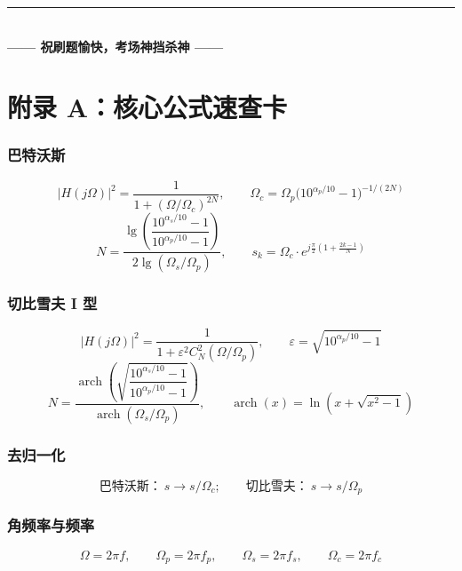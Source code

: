 \documentclass[12pt,a4paper]{ctexart}
\newcommand{\Omegac}{\Omega_c}
\newcommand{\Omegap}{\Omega_p}
\newcommand{\Omegas}{\Omega_s}
\newcommand{\arch}{\operatorname{arch}}
\begin{document}
\vspace{20pt}

\begin{center}
\rule{0.6\textwidth}{0.5pt}\\[8pt]
{\large\kaishu\bfseries —— 祝刷题愉快，考场神挡杀神 ——}
\end{center}

\newpage
\section*{附录 A：核心公式速查卡}

\begin{tcolorbox}[enhanced, colback=white, colframe=black!60,
    title={\textbf{公式速查：一张 A4 纸搞定滤波器设计}}, fonttitle=\bfseries\large,
    sharp corners, breakable]

\subsubsection*{巴特沃斯}
\[
|H(j\Omega)|^2 = \frac{1}{1+(\Omega/\Omegac)^{2N}},\qquad
\Omegac = \Omega_p\bigl(10^{\alpha_p/10}-1\bigr)^{-1/(2N)}
\]
\[
N = \frac{\lg\!\left(\dfrac{10^{\alpha_s/10}-1}{10^{\alpha_p/10}-1}\right)}{2\lg(\Omegas/\Omegap)},\qquad
s_k = \Omegac\cdot e^{j\frac{\pi}{2}\left(1+\frac{2k-1}{N}\right)}
\]

\subsubsection*{切比雪夫 I 型}
\[
|H(j\Omega)|^2 = \frac{1}{1+\varepsilon^2 C_N^2(\Omega/\Omegap)},\qquad
\varepsilon = \sqrt{10^{\alpha_p/10}-1}
\]
\[
N = \frac{\arch\!\left(\sqrt{\dfrac{10^{\alpha_s/10}-1}{10^{\alpha_p/10}-1}}\right)}{\arch(\Omegas/\Omegap)},\qquad
\arch(x) = \ln(x+\sqrt{x^2-1})
\]

\subsubsection*{去归一化}
\[
\text{巴特沃斯：}\ s\to s/\Omegac;\qquad
\text{切比雪夫：}\ s\to s/\Omegap
\]

\subsubsection*{角频率与频率}
\[
\Omega = 2\pi f,\qquad
\Omegap = 2\pi f_p,\qquad
\Omegas = 2\pi f_s,\qquad
\Omegac = 2\pi f_c
\]

\end{tcolorbox}

\end{document}
